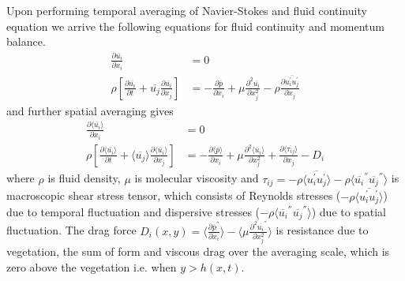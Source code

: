 \documentclass[12pt]{report}   %
\renewcommand{\bar}{\overline}
\begin{document}
 Upon performing temporal averaging of Navier-Stokes and fluid continuity equation we arrive the following equations for fluid continuity and momentum balance.
 \begin{equation}
 \begin{split}
 \frac{\partial \bar{u_i} }{\partial x_i} &=0 \\
 \rho \left[ \frac{\partial  \overline{u_i}  }{\partial t}+  \overline{u_j}  \frac{\partial  \overline{u_i} }{\partial x_j} \right ] &= -\frac{\partial  \bar{p}   }{\partial x_i} + \mu \frac{\partial^2  \overline{u_i}  }{\partial x_j^2} - \rho \frac{\partial  \overline { u_i^{'} u_j^{'} }  }{\partial x_j} 
 \end{split}
 \end{equation}
 and further spatial averaging gives
  \begin{equation}\label{averaged_eq}
  \begin{split}
  \frac{\partial \langle \bar{u_i} \rangle}{\partial x_i}&=0 \\
 \rho \left[ \frac{\partial \langle \overline{u_i} \rangle }{\partial t}+ \langle \overline{u_j} \rangle \frac{\partial \langle \bar{u_i} \rangle}{\partial x_j} \right ] &= -\frac{\partial \langle \bar{p} \rangle  }{\partial x_i} + \mu \frac{\partial^2 \langle \bar{u_i} \rangle }{\partial         x_j^2} + \frac{\partial \langle \bar{\tau_{ij}} \rangle }{\partial x_j} -D_i
 \end{split}
 \end{equation}
 where $\rho$ is fluid density, $\mu$ is molecular viscosity and 
 $\tau_{ij}=-\rho \langle \overline{u_i^{'} u_j^{'}} \rangle  -\rho \langle{ \overline{u_i}^{''} \overline{u_j}^{''} } \rangle  $ is macroscopic shear stress tensor, which consists of Reynolds stresses ($ -\rho \langle \overline {u_i^{'} u_j^{'}} \rangle $) due to temporal fluctuation and dispersive stresses ($ -\rho \langle{ \overline{u_i}^{''} \overline{u_j}^{''} } \rangle $) due to spatial fluctuation. The drag force $D_i(x,y) = \langle \frac{\partial \overline{p}^{''}}{\partial x_i} \rangle - \langle \mu \frac{\partial^2 \bar{u_i}^{''} }{\partial x_j^2} \rangle $ is resistance due to vegetation, the sum of form and viscous drag over the averaging scale, which is zero above the vegetation i.e.  when $y>h(x,t)$. 
 
\end{document}
